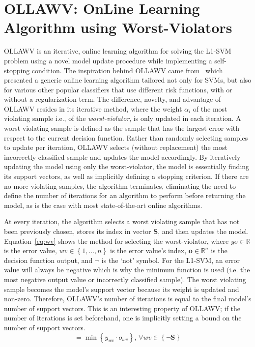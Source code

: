 \documentclass[reqno]{vcuthesis}
\newcommand{\set}[1]{{\left\{#1\right\}}}
\newcommand{\reals}{{\mathbb{R}}}
\numberwithin{equation}{chapter}
\begin{document}
\section{OLLAWV: OnLine Learning Algorithm using Worst-Violators}
OLLAWV is an iterative, online learning algorithm for solving the L1-SVM problem using a novel model update procedure while implementing a self-stopping condition. The inspiration behind OLLAWV came from~\cite{kecman2016fast} which presented a generic online learning algorithm tailored not only for SVMs, but also for various other popular classifiers that use different risk functions, with or without a regularization term. The difference, novelty, and advantage of OLLAWV resides in its iterative method, where the weight $\alpha_i$ of the most violating sample i.e., of the \textit{worst-violator}, is only updated in each iteration. A worst violating sample is defined as the sample that has the largest error with respect to the current decision function. Rather than randomly selecting samples to update per iteration, OLLAWV selects (without replacement) the most incorrectly classified sample and updates the model accordingly. By iteratively updating the model using only the worst-violator, the model is essentially finding its support vectors, as well as implicitly defining a stopping criterion. If there are no more violating samples, the algorithm terminates, eliminating the need to define the number of iterations for an algorithm to perform before returning the model, as is the case with most state-of-the-art online algorithms. 

At every iteration, the algorithm selects a worst violating sample that has not been previously chosen, stores its index in vector $\bm S$, and then updates the model. Equation~\ref{eq:wv} shows the method for selecting the worst-violator, where $yo \in \reals$ is the error value, $wv \in \set{1, \ldots, n}$ is the error value's index, $\bm o \in \reals^n$ is the decision function output, and $\neg$ is the `not' symbol. For the L1-SVM, an error value will always be negative which is why the minimum function is used (i.e. the most negative output value or incorrectly classified sample). The worst violating sample becomes the model's support vector because its weight is updated and non-zero. Therefore, OLLAWV's number of iterations is equal to the final model's number of support vectors. This is an interesting property of OLLAWV; if the number of iterations is set beforehand, one is implicitly setting a bound on the number of support vectors. 
\begin{equation}
[yo, wv] = \min \set{y_{wv} \cdot o_{wv}},\, \forall wv \in \set{\neg \bm S}
\label{eq:wv}
\end{equation}
\end{document}
